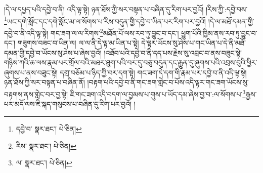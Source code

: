 །དེ་ལ་དཔྱད་པའི་དབྱེ་བ་ནི། འདི་ལྟ་སྟེ། ཉན་ཐོས་ཀྱི་སར་བསྟན་པ་བཞིན་དུ་རིག་པར་བྱའོ། །རིས་ཀྱི་:དབྱེ་བས་\footnote{དབྱེ་བ་  སྣར་ཐང་།  པེ་ཅིན། }ཡང་དགེ་སློང་དང་དགེ་སློང་མ་ལ་སོགས་པ་རིས་བདུན་གྱི་དབྱེ་བ་ཡིན་པར་རིག་པར་བྱའོ། །དེ་ལ་མཐོ་དམན་གྱི་དབྱེ་བ་ནི་འདི་ལྟ་སྟེ། གང་ཟག་ལ་ལ་རིགས་\footnote{རིས་  སྣར་ཐང་།  པེ་ཅིན། }མཐོན་པོ་ལས་རབ་ཏུ་བྱུང་བ་དང་། ཕྱུག་པོའི་ཁྱིམ་ནས་རབ་ཏུ་བྱུང་བ་དང་། གཟུགས་བཟང་བ་ཡིན་ལ། ལ་ལ་ནི་དེ་ལྟ་མ་ཡིན་པ་སྟེ། དེ་ལྟར་ཡོངས་སུ་ཤེས་པ་གང་ཡིན་པ་དེ་ནི་མཐོ་དམན་གྱི་དབྱེ་བ་ཡོངས་སུ་ཤེས་པ་ཞེས་བྱའོ། །འཐོབ་པའི་དབྱེ་བ་ནི་དད་པས་རྗེས་སུ་འབྲང་བ་ནས་བཟུང་སྟེ། གཉིས་ཀའི་ཆ་ལས་རྣམ་པར་གྲོལ་བའི་མཐར་ཐུག་པའི་བར་དུ་བཅུ་བདུན་དང་རྒྱུན་དུ་ཞུགས་པའི་འབྲས་བུའི་ཕྱིར་ཞུགས་པ་ནས་བཟུང་སྟེ། དགྲ་བཅོམ་པ་ཉིད་ཀྱི་བར་དག་སྟེ། གང་ཟག་དེ་དག་གི་རྣམ་པར་དབྱེ་བ་ནི་འདི་ལྟ་སྟེ། ཉན་ཐོས་ཀྱི་སར་བསྟན་པ་བཞིན་ནོ། །བརྟག་པའི་དབྱེ་བ་ནི་གང་ཟག་གླེང་བ་པོས་འདི་ལྟར་གང་ཟག་ཡོངས་སུ་བརྟགས་ནས་གླེང་བར་བྱ་སྟེ། ཇི་གང་ཟག་འདི་བདག་ལ་བྱམས་པ་གུས་པ་ཡོད་དམ་ཞེས་བྱ་བ་:ལ་སོགས་པ་\footnote{ལ་  སྣར་ཐང་།  པེ་ཅིན། }རྒྱས་པར་མདོ་ལས་ཇི་སྐད་གསུངས་པ་བཞིན་དུ་རིག་པར་བྱའོ། །

